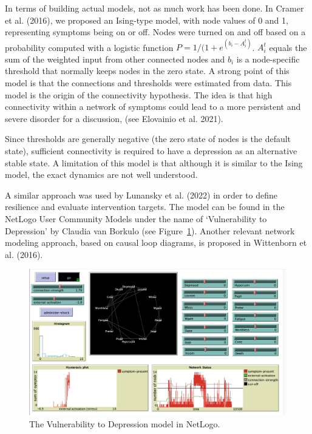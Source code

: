 \documentclass[
  a4paper,
  DIV=11,
  numbers=noendperiod,
  oneside]{scrreprt}
\begin{document}
In terms of building actual models, not as much work has been done. In
Cramer et al. (2016), we proposed an Ising-type model, with node values
of 0 and 1, representing symptoms being on or off. Nodes were turned on
and off based on a probability computed with a logistic function
\(P = 1/(1 + e^{(b_{i} - A_{i}^{t})}\). \(A_{i}^{t}\) equals the sum of
the weighted input from other connected nodes and \(b_{i}\) is a
node-specific threshold that normally keeps nodes in the zero state. A
strong point of this model is that the connections and thresholds were
estimated from data. This model is the origin of the connectivity
hypothesis. The idea is that high connectivity within a network of
symptoms could lead to a more persistent and severe disorder for a
discussion, (see Elovainio et al. 2021).

Since thresholds are generally negative (the zero state of nodes is the
default state), sufficient connectivity is required to have a depression
as an alternative stable state. A limitation of this model is that
although it is similar to the Ising model, the exact dynamics are not
well understood.

A similar approach was used by Lunansky et al. (2022) in order to define
resilience and evaluate intervention targets. The model can be found in
the NetLogo User Community Models under the name of `Vulnerability to
Depression' by Claudia van Borkulo (see
Figure~\ref{fig-ch6-img9-old-78}). Another relevant network modeling
approach, based on causal loop diagrams, is proposed in Wittenborn et
al. (2016).

\begin{figure}

{\centering \includegraphics{media/ch6/image9.jpg}

}

\caption{\label{fig-ch6-img9-old-78}The Vulnerability to Depression
model in NetLogo.}

\end{figure}
\end{document}
